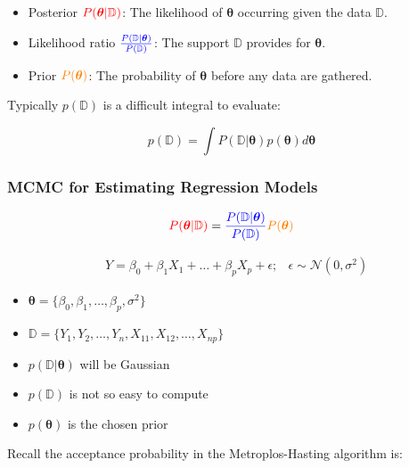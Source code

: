 \begin{itemize}
    \item Posterior $\textcolor{red}{P(\boldsymbol{\theta}|\mathbb{D})}$: The likelihood of $\boldsymbol{\theta}$ occurring given the data $\mathbb{D}$.
    \item Likelihood ratio $\textcolor{blue}{\frac{P(\mathbb{D}|\boldsymbol{\theta})}{P(\mathbb{D})}}$: The support $\mathbb{D}$ provides for $\boldsymbol{\theta}$.
    \item Prior $\textcolor{orange}{P(\boldsymbol{\theta})}$: The probability of $\boldsymbol{\theta}$ before any data are gathered.
\end{itemize}

Typically $p(\mathbb{D})$ is a difficult integral to evaluate:

\[
p(\mathbb{D}) = \int P(\mathbb{D}|\boldsymbol{\theta}) p(\boldsymbol{\theta})d\boldsymbol{\theta}
\]

\subsubsection{MCMC for Estimating Regression Models}

\indent 

\begin{align*}
    \textcolor{red}{P(\boldsymbol{\theta}|\mathbb{D})} = \textcolor{blue}{\frac{P(\mathbb{D}|\boldsymbol{\theta})}{P(\mathbb{D})}}\textcolor{orange}{P(\boldsymbol{\theta})}
\end{align*}

\begin{align*}
    & Y = \beta_0+\beta_1X_1+\ldots+\beta_pX_p+\epsilon; & \epsilon\sim \mathcal{N}(0,\sigma^2)
\end{align*}

\begin{itemize}
    \item $\boldsymbol{\theta} = \{\beta_0,\beta_1,\ldots,\beta_p,\sigma^2\}$
    \item $\mathbb{D} = \{Y_1,Y_2,\ldots,Y_n,X_{11},X_{12},\ldots,X_{np}\}$
    \item $p(\mathbb{D}|\boldsymbol{\theta})$ will be Gaussian
    \item $p(\mathbb{D})$ is not so easy to compute
    \item $p(\boldsymbol{\theta})$ is the chosen prior
\end{itemize}

Recall the acceptance probability in the Metroplos-Hasting algorithm is:

